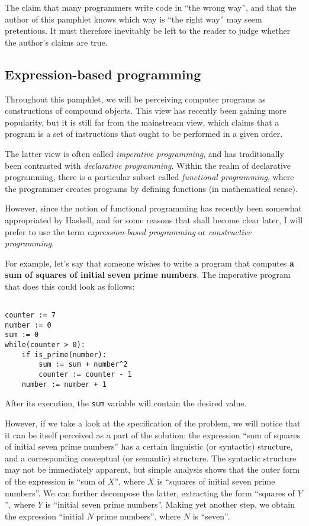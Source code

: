The claim that many programmers write code in ``the wrong way'',
and that the author of this pamphlet knows which way is 
``the right way'' may seem pretentious. It must therefore
inevitably be left to the reader to judge whether the author's
claims are true.

\subsection{Expression-based programming}

Throughout this pamphlet, we will be perceiving computer programs
as constructions of compound objects. This view has recently been
gaining more popularity, but it is still far from the mainstream
view, which claims that a program is a set of instructions that
ought to be performed in a given order.

The latter view is often called \textit{imperative programming},
and has traditionally been contrasted with \textit{declarative
 programming}.
Within the realm of declarative programming, there is a particular
subset called \textit{functional programming}, where the programmer
creates programs by defining functions (in mathematical sense).

However, since the notion of functional programming has recently
been somewhat appropriated by Haskell, and for some reasons that
shall become clear later, I will prefer to use the term
\textit{expression-based programming} or \textit{constructive
programming}.

For example, let's say that someone wishes to write a program that
computes \textbf{a sum of squares of initial seven prime numbers}. 
The imperative program that does this could look as follows:

\begin{Verbatim}[samepage=true]

counter := 7
number := 0
sum := 0
while(counter > 0):
    if is_prime(number):
        sum := sum + number^2
        counter := counter - 1
    number := number + 1

\end{Verbatim}

After its execution, the \texttt{sum} variable will contain the
desired value.

However, if we take a look at the specification of the problem,
we will notice that it can be itself perceived as a part of the
solution: the expression ``sum of squares of initial seven prime
 numbers'' has a certain linguistic (or syntactic) structure,
and a corresponding conceptual (or semantic) structure. The 
syntactic structure may not be immediately apparent, but simple
analysis shows that the outer form of the expression is 
``sum of $X$'', where $X$ is ``squares of initial seven prime
numbers''. We can further decompose the latter, extracting the 
form ``squares of $Y$'',  where $Y$ is ``initial seven prime 
numbers''. Making yet another step, we obtain the expression
``initial $N$ prime numbers'', where $N$ is ``seven''.

